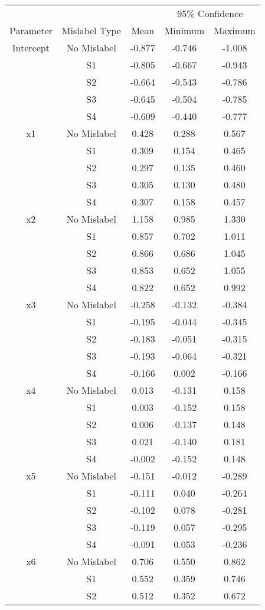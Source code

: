 \documentclass{article}
\begin{document}
\begin{table}\centering
\begin{tabular}{ c c c c c}
\toprule
&&&\multicolumn{2}{c}{95\% Confidence}\\
Parameter&Mislabel Type&Mean&Minimum&Maximum\\
\midrule
Intercept&No Mislabel&-0.877&-0.746&-1.008\\
&S1&-0.805&-0.667&-0.943\\
&S2&-0.664&-0.543&-0.786\\
&S3&-0.645&-0.504&-0.785\\
&S4&-0.609&-0.440&-0.777\\
\midrule
x1&No Mislabel&0.428&0.288&0.567\\
&S1&0.309&0.154&0.465\\
&S2&0.297&0.135&0.460\\
&S3&0.305&0.130&0.480\\
&S4&0.307&0.158&0.457\\
\midrule
x2&No Mislabel&1.158&0.985&1.330\\
&S1&0.857&0.702&1.011\\
&S2&0.866&0.686&1.045\\
&S3&0.853&0.652&1.055\\
&S4&0.822&0.652&0.992\\
\midrule
x3&No Mislabel&-0.258&-0.132&-0.384\\
&S1&-0.195&-0.044&-0.345\\
&S2&-0.183&-0.051&-0.315\\
&S3&-0.193&-0.064&-0.321\\
&S4&-0.166&0.002&-0.166\\
\midrule
x4&No Mislabel&0.013&-0.131&0.158\\
&S1&0.003&-0.152&0.158\\
&S2&0.006&-0.137&0.148\\
&S3&0.021&-0.140&0.181\\
&S4&-0.002&-0.152&0.148\\
\midrule
x5&No Mislabel&-0.151&-0.012&-0.289\\
&S1&-0.111&0.040&-0.264\\
&S2&-0.102&0.078&-0.281\\
&S3&-0.119&0.057&-0.295\\
&S4&-0.091&0.053&-0.236\\
\midrule
x6&No Mislabel&0.706&0.550&0.862\\
&S1&0.552&0.359&0.746\\
&S2&0.512&0.352&0.672\\

\end{tabular}
\end{table}
\end{document}

